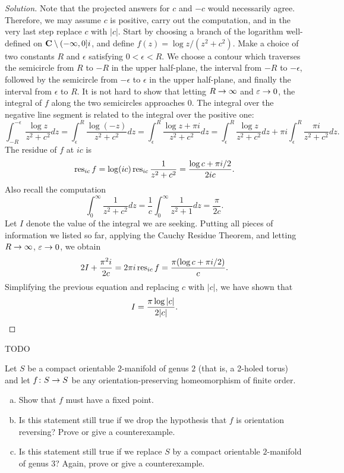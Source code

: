 \begin{proof}[Solution]
  Note that the projected answers for $c$ and $-c$ would necessarily agree. Therefore, we may assume $c$ is positive, carry out the computation, and in the very last step replace $c$ with $|c|$. Start by choosing a branch of the logarithm well-defined on $\mathbf{C} \setminus (-\infty,0]i$, and define $f(z) = \log z / (z^2 + c^2)$. Make a choice of two constants $R$ and $\epsilon$ satisfying $0 < \epsilon < R$. We choose a contour which traverses the semicircle from $R$ to $-R$ in the upper half-plane, the interval from $-R$ to $-\epsilon$, followed by the semicircle from $-\epsilon$ to $\epsilon$ in the upper half-plane, and finally the interval from $\epsilon$ to $R$. It is not hard to show that letting $R \rightarrow \infty$ and $\varepsilon \rightarrow 0$, the integral of $f$ along the two semicircles approaches $0$. The integral over the negative line segment is related to the integral over the positive one:
  \[
  \int_{-R}^{-\epsilon} \frac{\log z}{z^2 + c^2} d z =
  \int_\epsilon^R \frac{\log(-z)}{z^2 + c^2} d z =
  \int_\epsilon^R \frac{\log z + \pi i}{z^2 + c^2} d z =
  \int_\epsilon^R \frac{\log z}{z^2 + c^2} d z + \pi i \int_\epsilon^R \frac{\pi i}{z^2 + c^2} d z.
  \]
  The residue of $f$ at $i c$ is
  \[
  \operatorname{res}_{i c} f =
  \log(i c) \operatorname{res}_{i c} \frac{1}{z^2+c^2} =
  \frac{\log c + \pi i / 2}{2 i c}.
  \]
  Also recall the computation
  \[
  \int_0^\infty \frac{1}{z^2+c^2} d z =
  \frac{1}{c} \int_0^\infty \frac{1}{z^2 + 1} d z =
  \frac{\pi}{2 c}.
  \]
  Let $I$ denote the value of the integral we are seeking. Putting all pieces of information we listed so far, applying the Cauchy Residue Theorem, and letting $R \rightarrow \infty$, $\varepsilon \rightarrow 0$, we obtain
  \[
  2 I + \frac{\pi^2 i}{2 c} = 2 \pi i \operatorname{res}_{i c} f = \frac{\pi(\log c + \pi i/2)}{c}.
  \]
  Simplifying the previous equation and replacing $c$ with $|c|$, we have shown that
  \[
  I = \frac{\pi \log|c|}{2|c|}. \qedhere
  \]
\end{proof}


TODO


Let $S$ be a compact orientable $2$-manifold of genus $2$ (that is, a 2-holed torus) and let $f \colon S \rightarrow S$ be any orientation-preserving homeomorphism of finite order.
\begin{enumerate}[(a)]
\item Show that $f$ must have a fixed point.
\item Is this statement still true if we drop the hypothesis that $f$ is orientation reversing? Prove or give a counterexample.
\item Is this statement still true if we replace $S$ by a compact orientable $2$-manifold of genus 3? Again, prove or give a counterexample.
\end{enumerate}

